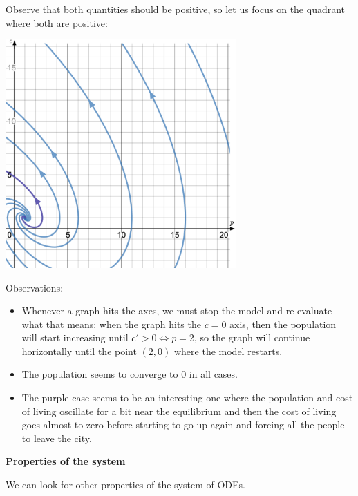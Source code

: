 Observe that both quantities should be positive, so let us focus on the quadrant where both are positive:
\begin{center}
	\includegraphics*[width=250pt]{images/module18-pc-closeup.pdf}
\end{center}

Observations:
\begin{itemize}
	\item Whenever a graph hits the axes, we must stop the model and re-evaluate what that means: when the graph hits the $c=0$ axis, then the population will start increasing until $c'>0 \Leftrightarrow p = 2$, so the graph will continue horizontally until the point $(2,0)$ where the model restarts.
	\item The population seems to converge to $0$ in all cases.
	\item The purple case seems to be an interesting one where the population and cost of living oscillate for a bit near the equilibrium and then the cost of living goes almost to zero before starting to go up again and forcing all the people to leave the city.
\end{itemize}



\hfill

\begin{center}
\textbf{\color{cyan}
Properties of the system
}
\end{center}

We can look for other properties of the system of ODEs.

